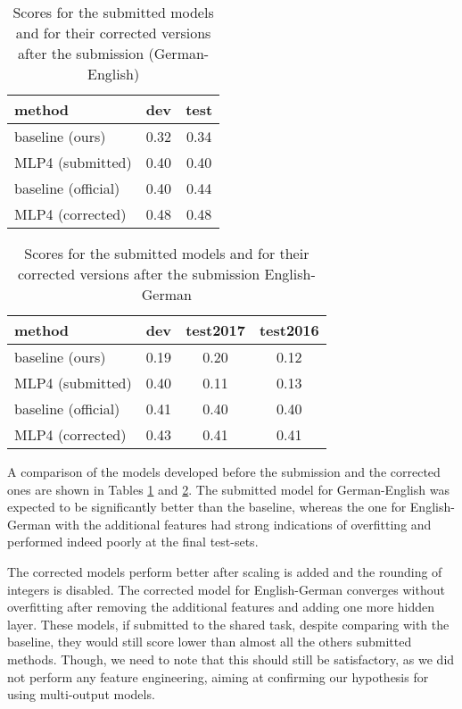 \documentclass[11pt,letterpaper]{article}
\begin{document}
\begin{table}[ht]
\center
\begin{tabular}{llc}
\toprule
method 	& \multicolumn{1}{c}{dev}	& test \\
\midrule
baseline (ours)	    & 0.32	& 0.34	\\
MLP4 (submitted)    & 0.40 	& 0.40  \\
\midrule
baseline (official)	& 0.40	& 0.44	\\
MLP4 (corrected)	& 0.48  & 0.48  \\
\bottomrule
\end{tabular}
\caption{Scores for the submitted models and for their corrected
versions after the submission (German-English)}
\label{tab:submission_de-en}
\end{table}


\begin{table}[ht]
\center
\begin{tabular}{lccc}
\toprule
method 	& \multicolumn{1}{c}{dev}	& test2017 & test2016 \\
\midrule
baseline (ours)			& 0.19	& 0.20 & 0.12  \\
MLP4 (submitted)		& 0.40 	& 0.11 & 0.13 \\
\midrule
baseline (official)		& 0.41	& 0.40 & 0.40 \\
MLP4 (corrected)		& 0.43  & 0.41 & 0.41 \\
\bottomrule
\end{tabular}
\caption{Scores for the submitted models and for their corrected versions after
the submission English-German}
\label{tab:submission_en-de}
\end{table}

A comparison of the models developed before the submission and the corrected
ones are shown in Tables \ref{tab:submission_de-en} and
\ref{tab:submission_en-de}. The submitted model for German-English was expected
to be significantly better than the baseline, whereas the one for English-German
with the additional features had strong indications of overfitting and performed
indeed poorly at the final test-sets. 

The corrected models perform better after scaling is added and the rounding of
integers is disabled. The corrected model for English-German converges without
overfitting after removing the additional features and adding one more hidden
layer. These models, if submitted to the shared task, despite comparing with the
baseline, they would still score lower than almost all the others submitted
methods. Though, we need to note that this should still be satisfactory, as we
did not perform any feature engineering, aiming at confirming our hypothesis for using
multi-output models.
\end{document}
